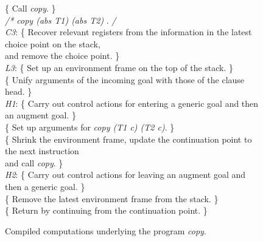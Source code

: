 \begin{figure}
\begin{tabbing}
\>            \>\{ \>Call {\it copy}.                                                                            \>\} \\
\> {\it /* copy (abs T1) (abs T2)}  . {\it */} \\
\> {\it C3}:  \>\{ \>Recover relevant registers from the information in the latest choice point on the stack,        \\
\>            \>  \>and remove the choice point.                                                             \>\} \\
\> {\it L3}:  \>\{ \>Set up an environment frame on the top of the stack.                                    \>\} \\
\>            \>\{ \>Unify arguments of the incoming goal with those of the clause head.                     \>\} \\
\> {\it H1}:  \>\{ \>Carry out control actions for entering a generic goal and then an augment goal.         \>\} \\
\>            \>\{ \>Set up arguments for {\it copy (T1 c) (T2 c)}.                                          \>\} \\
\>            \>\{ \>Shrink the environment frame, update the continuation point to the next instruction          \\
\>            \>   \>and call {\it copy}.                                                                    \>\} \\
\> {\it H2}:  \>\{ \>Carry out control actions for leaving an augment goal and then a generic goal.          \>\} \\
\>            \>\{ \>Remove the latest environment frame from the stack.                                        \>\} \\
\>            \>\{ \>Return by continuing from the continuation point.                                       \>\}
\end{tabbing}
\caption{Compiled computations underlying the program {\it
copy}.}\label{fig:copy_proc_model}
\end{figure}


